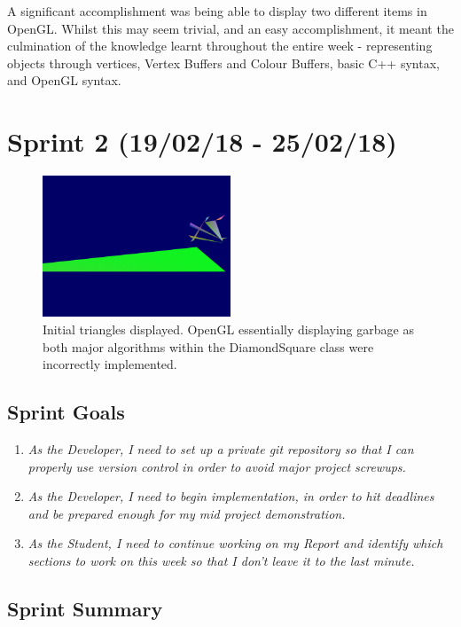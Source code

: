 \documentclass[a4paper,10pt]{report}
\begin{document}
A significant accomplishment was being able to display two different items in OpenGL. Whilst this may seem trivial, and an easy accomplishment, it meant the culmination of the knowledge learnt throughout the entire week - representing objects through vertices, Vertex Buffers and Colour Buffers, basic C++ syntax, and OpenGL syntax.\medskip

\clearpage
\section{Sprint 2 (19/02/18 - 25/02/18)}

\begin{figure}[h!]
    \centering
  \includegraphics[width=0.5\textwidth]{Images/Sprint-Images/Sprint2-1.png}
 \caption{Initial triangles displayed. OpenGL essentially displaying garbage as both major algorithms within the DiamondSquare class were incorrectly implemented.}
 \label{fig:sprint2-1}
\end{figure}

\subsection{Sprint Goals}
\begin{enumerate}
    \item \textit{As the Developer, I need to set up a private git repository so that I can properly use version control in order to avoid major project screwups.
    }
    \item \textit{As the Developer, I need to begin implementation, in order to hit deadlines and be prepared enough for my mid project demonstration.}
    \item\textit{As the Student, I need to continue working on my Report and identify which sections to work on this week so that I don't leave it to the last minute.}
    
\end{enumerate}

\subsection{Sprint Summary}
\end{document}
